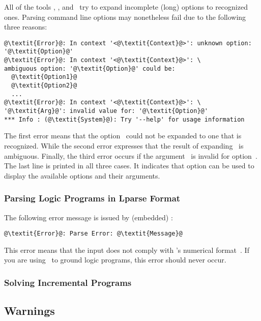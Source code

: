 All of the tools \gringo, \clasp, and \clingo\
try to expand incomplete (long) options to recognized ones.
Parsing command line options may nonetheless fail due to the following three reasons:
%
\begin{lstlisting}[numbers=none,escapechar=@]
@\textit{Error}@: In context '<@\textit{Context}@>': unknown option: '@\textit{Option}@'
@\textit{Error}@: In context '<@\textit{Context}@>': \
ambiguous option: '@\textit{Option}@' could be:
  @\textit{Option1}@
  @\textit{Option2}@
  ...
@\textit{Error}@: In context '<@\textit{Context}@>': \
'@\textit{Arg}@': invalid value for: '@\textit{Option}@'
*** Info : (@\textit{System}@): Try '--help' for usage information
\end{lstlisting}
%
The first error means that the option~
could not be expanded to one that is recognized.
While the second error expresses that the result of expanding~\code{\textit{Option}} is ambiguous.
Finally, the third error occurs if the argument~ is invalid for option~.
The last line is printed in all three cases.
It indicates that option \code{--help} can be used to display the available options and their arguments.

\subsubsection{Parsing Logic Programs in Lparse Format}\label{subsec:error:lparse}

The following error message is issued by (embedded) \clasp:
%
\begin{lstlisting}[numbers=none,escapechar=@]
@\textit{Error}@: Parse Error: @\textit{Message}@
\end{lstlisting}
%
This error means that the input does not comply with \lparse's numerical format~\cite{lparseManual}.
If you are using \gringo\ to ground logic programs,
this error should never occur.

\subsubsection{Solving Incremental Programs}
\tbfc{atom redefined error}

\subsection{Warnings}\label{subsec:warn}

